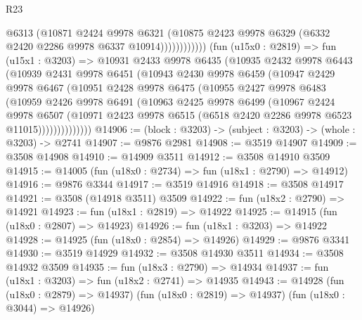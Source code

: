\begin{lexlean}{R23}
\begin{coremodule}
                          @6313
                          (@10871
                            @2424
                            @9978
                            @6321
                            (@10875
                              @2423
                              @9978
                              @6329
                              (@6332 @2420 @2286 @9978 @6337 @10914))))))))))))
        (fun (u15x0 : @2819) =>
        fun (u15x1 : @3203) =>
        @10931
          @2433
          @9978
          @6435
          (@10935
            @2432
            @9978
            @6443
            (@10939
              @2431
              @9978
              @6451
              (@10943
                @2430
                @9978
                @6459
                (@10947
                  @2429
                  @9978
                  @6467
                  (@10951
                    @2428
                    @9978
                    @6475
                    (@10955
                      @2427
                      @9978
                      @6483
                      (@10959
                        @2426
                        @9978
                        @6491
                        (@10963
                          @2425
                          @9978
                          @6499
                          (@10967
                            @2424
                            @9978
                            @6507
                            (@10971
                              @2423
                              @9978
                              @6515
                              (@6518 @2420 @2286 @9978 @6523 @11015))))))))))))))
@14906 := (block : @3203) -> (subject : @3203) -> (whole : @3203) -> @2741
@14907 := @9876 @2981
@14908 := @3519 @14907
@14909 := @3508 @14908
@14910 := @14909 @3511
@14912 := @3508 @14910 @3509
@14915 := @14005 (fun (u18x0 : @2734) => fun (u18x1 : @2790) => @14912)
@14916 := @9876 @3344
@14917 := @3519 @14916
@14918 := @3508 @14917
@14921 := @3508 (@14918 @3511) @3509
@14922 := fun (u18x2 : @2790) => @14921
@14923 := fun (u18x1 : @2819) => @14922
@14925 := @14915 (fun (u18x0 : @2807) => @14923)
@14926 := fun (u18x1 : @3203) => @14922
@14928 := @14925 (fun (u18x0 : @2854) => @14926)
@14929 := @9876 @3341
@14930 := @3519 @14929
@14932 := @3508 @14930 @3511
@14934 := @3508 @14932 @3509
@14935 := fun (u18x3 : @2790) => @14934
@14937 := fun (u18x1 : @3203) => fun (u18x2 : @2741) => @14935
@14943 := @14928
    (fun (u18x0 : @2879) => @14937)
    (fun (u18x0 : @2819) => @14937)
    (fun (u18x0 : @3044) => @14926)

\end{coremodule}
\end{lexlean}
